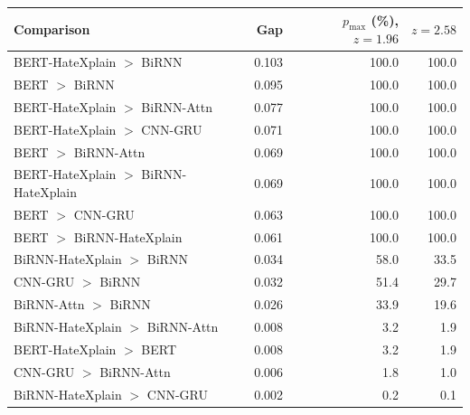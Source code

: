 \begin{tabular}{@{}lrrr@{}}
\toprule
Comparison & Gap & $p_{\max}$ (\%), $z{=}1.96$ & $z{=}2.58$ \\
\midrule
BERT-HateXplain $>$ BiRNN & 0.103 & 100.0 & 100.0 \\
BERT $>$ BiRNN & 0.095 & 100.0 & 100.0 \\
BERT-HateXplain $>$ BiRNN-Attn & 0.077 & 100.0 & 100.0 \\
BERT-HateXplain $>$ CNN-GRU & 0.071 & 100.0 & 100.0 \\
BERT $>$ BiRNN-Attn & 0.069 & 100.0 & 100.0 \\
BERT-HateXplain $>$ BiRNN-HateXplain & 0.069 & 100.0 & 100.0 \\
BERT $>$ CNN-GRU & 0.063 & 100.0 & 100.0 \\
BERT $>$ BiRNN-HateXplain & 0.061 & 100.0 & 100.0 \\
BiRNN-HateXplain $>$ BiRNN & 0.034 & 58.0 & 33.5 \\
CNN-GRU $>$ BiRNN & 0.032 & 51.4 & 29.7 \\
BiRNN-Attn $>$ BiRNN & 0.026 & 33.9 & 19.6 \\
BiRNN-HateXplain $>$ BiRNN-Attn & 0.008 & 3.2 & 1.9 \\
BERT-HateXplain $>$ BERT & 0.008 & 3.2 & 1.9 \\
CNN-GRU $>$ BiRNN-Attn & 0.006 & 1.8 & 1.0 \\
BiRNN-HateXplain $>$ CNN-GRU & 0.002 & 0.2 & 0.1 \\
\bottomrule
\end{tabular}

